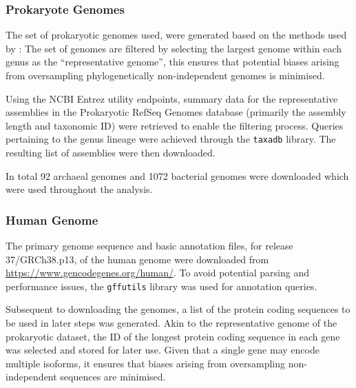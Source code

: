 \documentclass[../main.tex]{subfile}
\begin{document}
        \subsubsection{Prokaryote Genomes}
            The set of prokaryotic genomes used, were generated based on the methods used by \textcite{Ho2019}: The set of genomes are filtered by selecting the largest genome within each genus as the ``representative genome'', this ensures that potential biases arising from oversampling phylogenetically non-independent genomes is minimised.

            Using the NCBI Entrez utility endpoints, summary data for the representative assemblies in the Prokaryotic RefSeq Genomes database (primarily the assembly length and taxonomic ID) were retrieved to enable the filtering process. Queries pertaining to the genus lineage were achieved through the \texttt{taxadb} library. The resulting list of assemblies were then downloaded.

            In total 92 archaeal genomes and 1072 bacterial genomes were downloaded which were used throughout the analysis.
        \subsubsection{Human Genome}
            The primary genome sequence and basic annotation files, for release 37/GRCh38.p13, of the human genome were downloaded from \href{GENCODE}{https://www.gencodegenes.org/human/}. To avoid potential parsing and performance issues, the \texttt{gffutils} library was used for annotation queries.

            Subsequent to downloading the genomes, a list of the protein coding sequences to be used in later steps was generated. Akin to the representative genome of the prokaryotic dataset, the ID of the longest protein coding sequence in each gene was selected and stored for later use. Given that a single gene may encode multiple isoforms, it ensures that biases arising from oversampling non-independent sequences are minimised.
\end{document}
